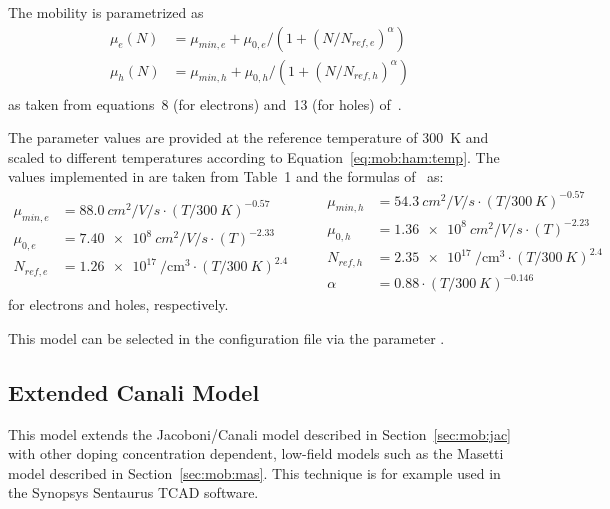 The mobility is parametrized as
\begin{equation}
    \label{eq:mob:aro}
    \begin{split}
        \mu_e(N) &= \mu_{min,e} + \mu_{0,e} / \left(1 + (N / N_{ref,e})^{\alpha}\right)\\
        \mu_h(N) &= \mu_{min,h} + \mu_{0,h} / \left(1 + (N / N_{ref,h})^{\alpha}\right)\\
    \end{split}
\end{equation}
as taken from equations~8 (for electrons) and~13 (for holes) of~\cite{arora}.

The parameter values are provided at the reference temperature of \SI{300}{K} and scaled to different temperatures according to Equation~\eqref{eq:mob:ham:temp}.
The values implemented in \apsq are taken from Table~1 and the formulas of~\cite{arora} as:
\begin{equation*}
    \begin{split}
        \mu_{min,e} &= \SI{88.0}{cm^2 \per V \per s} \cdot (T / \SI{300}{K})^{-0.57}\\
        \mu_{0,e}   &= \SI{7.40e8}{cm^2 \per V \per s} \cdot (T)^{-2.33}\\
        N_{ref,e}   &= \SI{1.26e17}{\per \cubic \cm} \cdot (T / \SI{300}{K})^{2.4}\\
    \end{split}
    \qquad
    \begin{split}
        \mu_{min,h} &= \SI{54.3}{cm^2 \per V \per s} \cdot (T / \SI{300}{K})^{-0.57}\\
        \mu_{0,h}   &= \SI{1.36e8}{cm^2 \per V \per s} \cdot (T)^{-2.23}\\
        N_{ref,h}   &= \SI{2.35e17}{\per \cubic \cm} \cdot (T / \SI{300}{K})^{2.4}\\
        \alpha   &= 0.88 \cdot (T / \SI{300}{K})^{-0.146}
    \end{split}
\end{equation*}
for electrons and holes, respectively.

This model can be selected in the configuration file via the parameter .

\subsection{Extended Canali Model}

This model extends the Jacoboni/Canali model described in Section~\ref{sec:mob:jac} with other doping concentration dependent, low-field models such as the Masetti model described in Section~\ref{sec:mob:mas}.
This technique is for example used in the Synopsys Sentaurus TCAD software.


